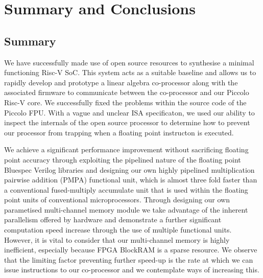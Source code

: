 \documentclass[a4paper,8pt]{report}
\begin{document}


\chapter{Summary and Conclusions} 
\section{Summary}
We have successfully made use of open source resources to synthesise a minimal
functioning Risc-V SoC. This system acts as a suitable baseline and allows us to
rapidly develop and prototype a linear algebra co-processor along with the
associated firmware to communicate between the co-processor and our Piccolo
Risc-V core. We successfully fixed the problems within the source code of the
Piccolo FPU. With a vague and unclear ISA specificaton, we used our ability to
inspect the internals of the open source processor to determine how to prevent
our processor from trapping when a floating point instructon is executed.

We achieve a significant performance improvement without sacrificing floating point
accuracy through exploiting the pipelined nature of the floating point Bluespec
Verilog libraries and designing our own highly pipelined multiplication pairwise
addition (PMPA) functional unit, which is almost three fold faster than a
conventional fused-multiply accumulate unit that is used within the floating
point units of conventional microprocessors. Through designing our own
parametised multi-channel memory module we take advantage of the inherent
parallelism offered by hardware and demonstrate a further significant computation
speed increase through the use of multiple functional units. However, it is
vital to consider that our multi-channel memory is highly inefficient,
especially because FPGA BlockRAM is a sparse resource. We observe that the
limiting factor preventing further speed-up is the rate at which we can issue
instructions to our co-processor and we contemplate ways of increasing this.
\end{document}
